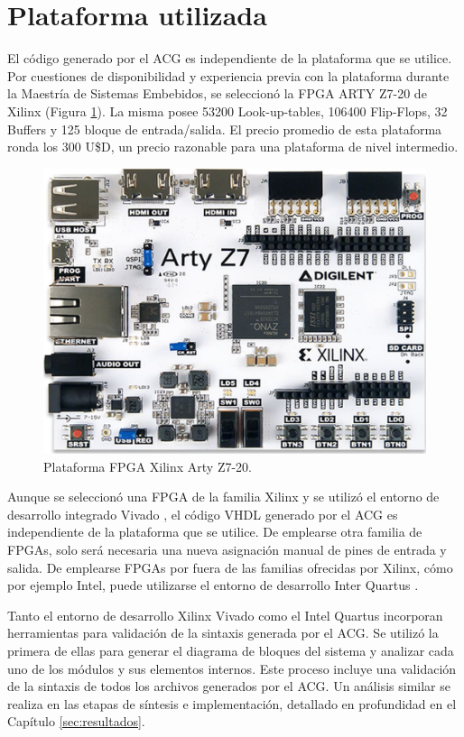 \section{Plataforma utilizada}
	\label{sec:AGG}
	
	El código generado por el ACG es independiente de la plataforma que se utilice. Por cuestiones de disponibilidad y experiencia previa con la plataforma durante la Maestría de Sistemas Embebidos, se seleccionó la FPGA ARTY Z7-20 de Xilinx (Figura \ref{fig:FPGA}). La misma posee 53200 Look-up-tables, 106400 Flip-Flops, 32 Buffers y 125 bloque de entrada/salida. El precio promedio de esta plataforma ronda los 300 U\$D, un precio razonable para una plataforma de nivel intermedio.	
	
	\begin{figure}[H]
		\centering
		\includegraphics[width=1\textwidth]{Figuras/FPGA}
		\centering\caption{Plataforma FPGA Xilinx Arty Z7-20.}
		\label{fig:FPGA}
	\end{figure}
	
	Aunque se seleccionó una FPGA de la familia Xilinx y se utilizó el entorno de desarrollo integrado Vivado \cite{VIVADO}, el código VHDL generado por el ACG es independiente de la plataforma que se utilice. De emplearse otra familia de FPGAs, solo será necesaria una nueva asignación manual de pines de entrada y salida. De emplearse FPGAs por fuera de las familias ofrecidas por Xilinx, cómo por ejemplo Intel, puede utilizarse el entorno de desarrollo Inter Quartus \cite{QUARTUS}.
	
	Tanto el entorno de desarrollo Xilinx Vivado como el Intel Quartus incorporan herramientas para validación de la sintaxis generada por el ACG. Se utilizó la primera de ellas para generar el diagrama de bloques del sistema y analizar cada uno de los módulos y sus elementos internos. Este proceso incluye una validación de la sintaxis de todos los archivos generados por el ACG. Un análisis similar se realiza en las etapas de síntesis e implementación, detallado en profundidad en el Capítulo \ref{sec:resultados}.
	
